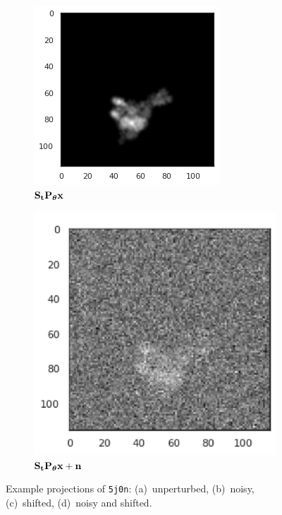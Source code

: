 \begin{figure}[ht!]
\begin{minipage}[b]{0.35\linewidth}
\begin{subfigure}[b]{0.49\linewidth}
            \centering
            \includegraphics[width=0.8\linewidth]{figures/5j0n_translated}
            \caption{$\mathbf{S}_{\mathbf{t}} \mathbf{P}_{{\boldsymbol{\theta}}} \mathbf{x}$}
        \end{subfigure}
        \hfill
        \begin{subfigure}[b]{0.49\linewidth}
            \centering
            \includegraphics[width=0.8\linewidth]{figures/5j0n_noise16_translated}
            \caption{$\mathbf{S}_{\mathbf{t}} \mathbf{P}_{{\boldsymbol{\theta}}} \mathbf{x} + \mathbf{n}$}
        \end{subfigure}
        \caption{%
            Example projections of \texttt{5j0n}: (a)~unperturbed, (b)~noisy, (c)~shifted, (d)~noisy and shifted.
        }\label{fig:different-projections}
    \end{minipage}
\end{figure}

